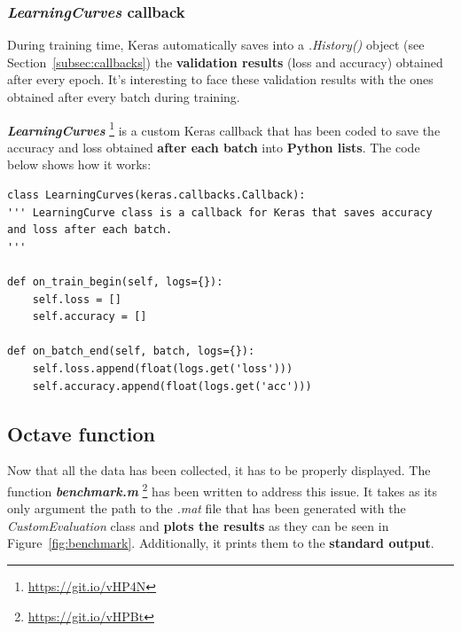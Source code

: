 \subsubsection{\textit{LearningCurves} callback} \label{subsubsec:learningcurves}
During training time, Keras automatically saves into a \textit{.History()} object (see Section~\ref{subsec:callbacks}) the \textbf{validation results} (loss and accuracy) obtained after every epoch. It's interesting to face these validation results with the ones obtained after every batch during training.

\textbf{\textit{LearningCurves}} \footnote{\url{https://git.io/vHP4N}} is a custom Keras callback that has been coded to save the accuracy and loss obtained \textbf{after each batch} into \textbf{Python lists}. The code below shows how it works:
\begin{lstlisting}
class LearningCurves(keras.callbacks.Callback):
''' LearningCurve class is a callback for Keras that saves accuracy
and loss after each batch.
'''    

def on_train_begin(self, logs={}):
	self.loss = []
	self.accuracy = []

def on_batch_end(self, batch, logs={}):
	self.loss.append(float(logs.get('loss')))
	self.accuracy.append(float(logs.get('acc')))
\end{lstlisting}

\subsection{Octave function}
Now that all the data has been collected, it has to be properly displayed. The function \textbf{\textit{benchmark.m}} \footnote{\url{https://git.io/vHPBt}} has been written to address this issue. It takes as its only argument the path to the \textit{.mat} file that has been generated with the \textit{CustomEvaluation} class and \textbf{plots the results} as they can be seen in Figure~\ref{fig:benchmark}. Additionally, it prints them to the \textbf{standard output}.

